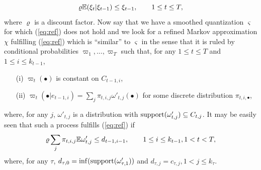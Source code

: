 \documentclass{article}              %
\begin{document}
\begin{equation}
\varrho\mathbb{E}(\xi_{t}|\xi_{t-1})\leq\xi_{t-1},\qquad1\leq t\leq T,\label{eq:ref}
\end{equation}
where $\varrho$ is a discount factor. 
Now say that we have a smoothed quantization
$\varsigma$ for which (\ref{eq:ref}) does not hold and we look for a refined
Markov approximation $\chi$ fulfilling (\ref{eq:ref}) which
is ``similar'' to $\varsigma$ in the sense that it is ruled by
conditional probabilities $\varpi_{1},\dots,\varpi_{T}$ such that, for any  $1\leq t \leq T$ and $1\leq i \leq k_{t-1}$,
\begin{itemize}
\item[(i)] $\varpi_{t}(\bullet)$ is constant on $C_{t-1,i}$,
\item[(ii)] $\varpi_{t}(\bullet|e_{t-1,i})=\sum_{j}\pi_{t,i,j}\omega'_{t,j}(\bullet)$ for some discrete distribution
$\pi_{t,i,\bullet}$,
\end{itemize}
where, for any $j$, $\omega'_{t,j}$ is a distribution with $\mathrm{support}(\omega'_{t,j})\subseteq C_{t,j}$.  It may be easily seen that such a
process fulfills (\ref{eq:ref}) if
\begin{equation}
\varrho\sum_{j}\pi_{t,i,j}\mathbb{E}\omega'_{t,j}\leq d_{t-1,i-1},\qquad1\leq i\leq k_{t-1},1<t<T,\label{eq:refneeded}
\end{equation}
where, for any $\tau$, $d_{\tau,0}=\inf(\mathrm{support}(\omega'_{\tau,1}))$ and $d_{\tau,j}=c_{\tau,j},1<j\leq k_{\tau}.$
\end{document}
